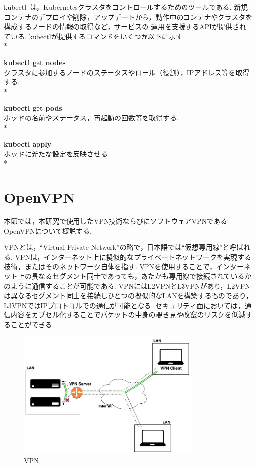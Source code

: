 kubectl~\cite{kubectl}は，Kubernetesクラスタをコントロールするためのツールである.
新規コンテナのデプロイや削除，アップデートから，動作中のコンテナやクラスタを構成するノードの情報の取得など，サービスの
運用を支援するAPIが提供されている.
kubectlが提供するコマンドをいくつか以下に示す.\\*

{\bf kubectl get nodes}\\
クラスタに参加するノードのステータスやロール（役割），IPアドレス等を取得する.\\*

{\bf kubectl get pods}\\
ポッドの名前やステータス，再起動の回数等を取得する.\\*

{\bf kubectl apply}\\
ポッドに新たな設定を反映させる.\\*

\section{OpenVPN}
\label{background:openvpn}

本節では，本研究で使用したVPN技術ならびにソフトウェアVPNであるOpenVPNについて概説する.

VPNとは，``Virtual Private Network''の略で，日本語では``仮想専用線''と呼ばれる.
VPNは，インターネット上に擬似的なプライベートネットワークを実現する技術，またはそのネットワーク自体を指す.
VPNを使用することで，インターネット上の異なるセグメント同士であっても，あたかも専用線で接続されているかのように通信することが可能である.
VPNにはL2VPNとL3VPNがあり，L2VPNは異なるセグメント同士を接続しひとつの擬似的なLANを構築するものであり，L3VPNではIPプロトコルでの通信が可能となる.
セキュリティ面においては，通信内容をカプセル化することでパケットの中身の覗き見や改竄のリスクを低減することができる.

\begin{figure}[htbp]
\begin{center}
    \includegraphics[width=0.8\textwidth]{./figures/openvpn.jpg}
    \caption{VPN}
\end{center}
\end{figure}

